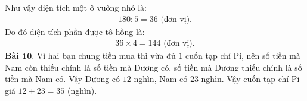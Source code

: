 \begin{multicols}{2}
\begin{figure}[H]
		\vspace*{-15pt}
	\end{figure}
	Như vậy diện tích một ô vuông nhỏ là: 
	\begin{align*}
		180:5 = 36 \text{ (đơn vị).}
	\end{align*}
	Do đó diện tích phần được tô hồng là: 
	\begin{align*}
		36\times 4 = 144 \text{ (đơn vị).}
	\end{align*}
	\textbf{\color{toancuabi}Bài $\pmb{10.}$} Vì hai bạn chung tiền mua thì vừa đủ $1$ cuốn tạp chí Pi, nên số tiền mà Nam còn thiếu chính là số tiền mà Dương có, số tiền mà Dương thiếu chính là số tiền mà Nam có. Vậy Dương có $12$ nghìn, Nam có $23$ nghìn. Vậy cuốn tạp chí Pi giá $12+23=35$ (nghìn).
\end{multicols}
\newpage
\graphicspath{{../toancuabi/pic/}}
\begingroup
{}  
